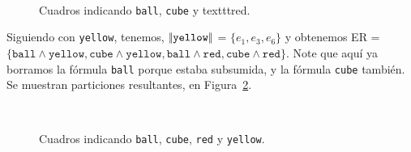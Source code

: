 \begin{figure}[ht]
\begin{center}
\\[0pt]
\caption{Cuadros indicando \texttt{ball}, \texttt{cube} y texttt{red}.}
\label{fig-modelo9}
\end{center}
\end{figure}
%
Siguiendo con \texttt{yellow}, tenemos, $|\!|\texttt{yellow}|\!|$ = $\{e_1, e_3, e_6\}$ y obtenemos ER = $\{\texttt{ball} \wedge \texttt{yellow}, 
\texttt{cube} \wedge \texttt{yellow}, \texttt{ball} \wedge \texttt{red}, \texttt{cube} \wedge \texttt{red}\}$. 
Note que aqu\'i ya borramos la f\'ormula \texttt{ball} porque estaba subsumida, y la f\'ormula \texttt{cube} tambi\'en. 
Se muestran particiones resultantes, en Figura~\ref{fig-modelo10}.

%

\begin{figure}[ht]
\begin{center}
\\[0pt]
\caption{Cuadros indicando \texttt{ball}, \texttt{cube}, \texttt{red} y \texttt{yellow}.}
\label{fig-modelo10}
\end{center}
\end{figure}

